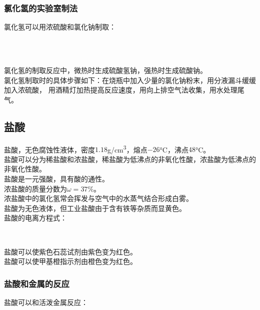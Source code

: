 \documentclass[UTF8]{ctexart}
\begin{document}
\subsubsection{氯化氢的实验室制法}
    氯化氢可以用浓硫酸和氯化钠制取：
    \begin{center}
        \\[3mm]
        \\[6mm]
    \end{center}
    氯化氢的制取反应中，微热时生成硫酸氢钠，强热时生成硫酸钠。\\[3mm]
    氯化氢制取时的具体步骤如下：在烧瓶中加入少量的氯化钠粉末，用分液漏斗缓缓加入浓硫酸，
    用酒精灯加热提高反应速度，用向上排空气法收集，用水处理尾气。\\

\subsection{盐酸}
    盐酸，无色腐蚀性液体，密度$1.18$\si{g/cm^3}，熔点$-26$\si{\degreeCelsius}，沸点$48$\si{\degreeCelsius}。\\[3mm]
    盐酸可以分为稀盐酸和浓盐酸，稀盐酸为低沸点的非氧化性酸，浓盐酸为低沸点的非氧化性酸。\\[3mm]
    盐酸是一元强酸，具有酸的通性。\\[6mm]
    浓盐酸的质量分数为$\omega=37\%$。\\[3mm]
    浓盐酸中的氯化氢常会挥发与空气中的水蒸气结合形成白雾。\\[3mm]
    盐酸为无色液体，但工业盐酸由于含有铁等杂质而显黄色。\\[6mm]
    盐酸的电离方程式：
    \begin{center}
        \\[6mm]
    \end{center}
    盐酸可以使紫色石蕊试剂由紫色变为红色。\\[3mm]
    盐酸可以使甲基橙指示剂由橙色变为红色。

\newpage

\subsubsection{盐酸和金属的反应}
    盐酸可以和活泼金属反应：
    \begin{center}
        \\[3mm]
        \\[6mm]
    \end{center}\vspace{5pt}
\end{document}
